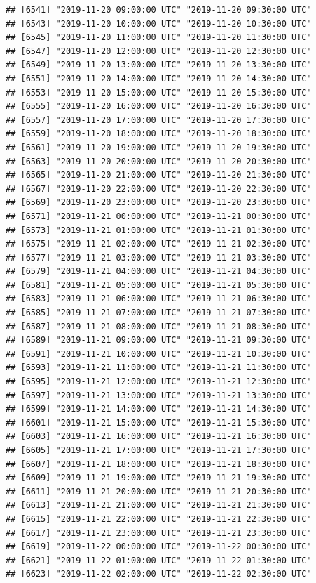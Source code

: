 \documentclass{article}\usepackage[]{graphicx}\usepackage[]{color}
\makeatletter
\newenvironment{kframe}{%
 \def\at@end@of@kframe{}%
 \ifinner\ifhmode%
  \def\at@end@of@kframe{\end{minipage}}%
  \begin{minipage}{\columnwidth}%
 \fi\fi%
 \def\FrameCommand##1{\hskip\@totalleftmargin \hskip-\fboxsep
 \colorbox{shadecolor}{##1}\hskip-\fboxsep
     \hskip-\linewidth \hskip-\@totalleftmargin \hskip\columnwidth}%
 \MakeFramed {\advance\hsize-\width
   \@totalleftmargin\z@ \linewidth\hsize
   \@setminipage}}%
 {\par\unskip\endMakeFramed%
 \at@end@of@kframe}
\newenvironment{knitrout}{}{} %
\makeatother
\begin{document}
\begin{knitrout}
\begin{kframe}
\begin{verbatim}
## [6541] "2019-11-20 09:00:00 UTC" "2019-11-20 09:30:00 UTC"
## [6543] "2019-11-20 10:00:00 UTC" "2019-11-20 10:30:00 UTC"
## [6545] "2019-11-20 11:00:00 UTC" "2019-11-20 11:30:00 UTC"
## [6547] "2019-11-20 12:00:00 UTC" "2019-11-20 12:30:00 UTC"
## [6549] "2019-11-20 13:00:00 UTC" "2019-11-20 13:30:00 UTC"
## [6551] "2019-11-20 14:00:00 UTC" "2019-11-20 14:30:00 UTC"
## [6553] "2019-11-20 15:00:00 UTC" "2019-11-20 15:30:00 UTC"
## [6555] "2019-11-20 16:00:00 UTC" "2019-11-20 16:30:00 UTC"
## [6557] "2019-11-20 17:00:00 UTC" "2019-11-20 17:30:00 UTC"
## [6559] "2019-11-20 18:00:00 UTC" "2019-11-20 18:30:00 UTC"
## [6561] "2019-11-20 19:00:00 UTC" "2019-11-20 19:30:00 UTC"
## [6563] "2019-11-20 20:00:00 UTC" "2019-11-20 20:30:00 UTC"
## [6565] "2019-11-20 21:00:00 UTC" "2019-11-20 21:30:00 UTC"
## [6567] "2019-11-20 22:00:00 UTC" "2019-11-20 22:30:00 UTC"
## [6569] "2019-11-20 23:00:00 UTC" "2019-11-20 23:30:00 UTC"
## [6571] "2019-11-21 00:00:00 UTC" "2019-11-21 00:30:00 UTC"
## [6573] "2019-11-21 01:00:00 UTC" "2019-11-21 01:30:00 UTC"
## [6575] "2019-11-21 02:00:00 UTC" "2019-11-21 02:30:00 UTC"
## [6577] "2019-11-21 03:00:00 UTC" "2019-11-21 03:30:00 UTC"
## [6579] "2019-11-21 04:00:00 UTC" "2019-11-21 04:30:00 UTC"
## [6581] "2019-11-21 05:00:00 UTC" "2019-11-21 05:30:00 UTC"
## [6583] "2019-11-21 06:00:00 UTC" "2019-11-21 06:30:00 UTC"
## [6585] "2019-11-21 07:00:00 UTC" "2019-11-21 07:30:00 UTC"
## [6587] "2019-11-21 08:00:00 UTC" "2019-11-21 08:30:00 UTC"
## [6589] "2019-11-21 09:00:00 UTC" "2019-11-21 09:30:00 UTC"
## [6591] "2019-11-21 10:00:00 UTC" "2019-11-21 10:30:00 UTC"
## [6593] "2019-11-21 11:00:00 UTC" "2019-11-21 11:30:00 UTC"
## [6595] "2019-11-21 12:00:00 UTC" "2019-11-21 12:30:00 UTC"
## [6597] "2019-11-21 13:00:00 UTC" "2019-11-21 13:30:00 UTC"
## [6599] "2019-11-21 14:00:00 UTC" "2019-11-21 14:30:00 UTC"
## [6601] "2019-11-21 15:00:00 UTC" "2019-11-21 15:30:00 UTC"
## [6603] "2019-11-21 16:00:00 UTC" "2019-11-21 16:30:00 UTC"
## [6605] "2019-11-21 17:00:00 UTC" "2019-11-21 17:30:00 UTC"
## [6607] "2019-11-21 18:00:00 UTC" "2019-11-21 18:30:00 UTC"
## [6609] "2019-11-21 19:00:00 UTC" "2019-11-21 19:30:00 UTC"
## [6611] "2019-11-21 20:00:00 UTC" "2019-11-21 20:30:00 UTC"
## [6613] "2019-11-21 21:00:00 UTC" "2019-11-21 21:30:00 UTC"
## [6615] "2019-11-21 22:00:00 UTC" "2019-11-21 22:30:00 UTC"
## [6617] "2019-11-21 23:00:00 UTC" "2019-11-21 23:30:00 UTC"
## [6619] "2019-11-22 00:00:00 UTC" "2019-11-22 00:30:00 UTC"
## [6621] "2019-11-22 01:00:00 UTC" "2019-11-22 01:30:00 UTC"
## [6623] "2019-11-22 02:00:00 UTC" "2019-11-22 02:30:00 UTC"

\end{verbatim}
\end{kframe}
\end{knitrout}
\end{document}
